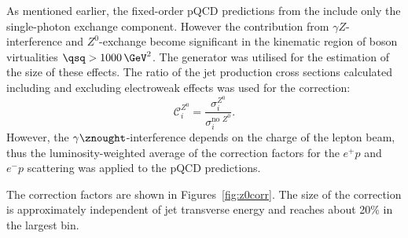As mentioned earlier, the fixed-order pQCD predictions from the \nlojet include only the single-photon exchange component. However the contribution from $\gamma Z$-interference and $Z^0$-exchange become significant in the kinematic region of boson virtualities $\qsq > 1000\, \GeV^{2}$. The \lepto generator was utilised for the estimation of the size of these effects. The ratio of the jet production cross sections calculated including and excluding electroweak effects was used for the correction:
\begin{equation}
 \mathcal{C}^\text{$Z^0$}_i = \frac{\sigma_i^\text{$Z^0$}}{\sigma_i^\text{no $Z^0$}}.
 \label{eq:z0corr}
\end{equation}
However, the $\gamma\znought$-interference depends on the charge of the lepton beam, thus the luminosity-weighted average of the correction factors for the $e^+p$ and $e^-p$ scattering was applied to the pQCD predictions.

The correction factors are shown in Figures~\ref{fig:z0corr}. The size of the correction is approximately independent of jet transverse energy and reaches about 20\% in the largest \qsq bin.


